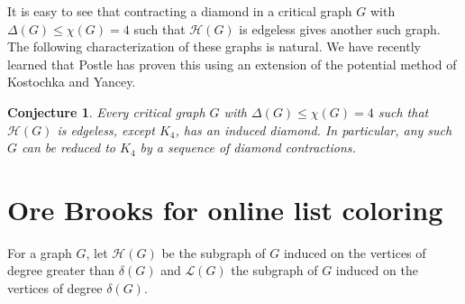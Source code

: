 \documentclass[12pt]{article}
\theoremstyle{plain}
\newtheorem{conjecture}[thm]{Conjecture}
\theoremstyle{definition}
\theoremstyle{remark}
\newcommand{\fancy}[1]{\mathcal{#1}}
\renewcommand{\L}{\fancy{L}}
\newcommand{\HH}{\fancy{H}}
\newcommand{\set}[1]{\left\{ #1 \right\}}
\newcommand{\irange}[1]{\left[#1\right]}
\begin{document}
%

It is easy to see that contracting a diamond in a critical graph $G$ with $\Delta(G) \leq \chi(G) = 4$ such that $\HH(G)$ is edgeless gives another such graph.  The following characterization of these graphs is natural.  We have recently learned that Postle has proven this using an extension of the potential method of Kostochka and Yancey.

\begin{conjecture}\label{ContractionConjecture}
Every critical graph $G$ with $\Delta(G) \leq \chi(G) = 4$ such that $\HH(G)$ is edgeless, except $K_4$, has an induced diamond. In particular, any such $G$ can be reduced to $K_4$ by a sequence of diamond contractions.
\end{conjecture}

\section{Ore Brooks for online list coloring}
For a graph $G$, let $\HH(G)$ be the subgraph of $G$ induced on the vertices of degree greater than $\delta(G)$ and $\L(G)$ the subgraph of $G$ induced on the vertices of degree $\delta(G)$.
\end{document}
